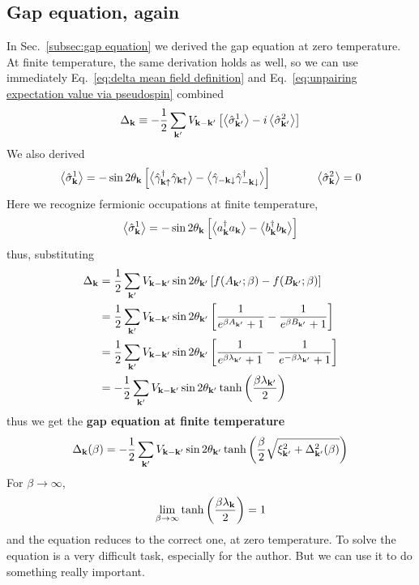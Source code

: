 \subsection{Gap equation, again}

In Sec.~\ref{subsec:gap equation} we derived the gap equation at zero temperature. At finite temperature, the same derivation holds as well, so we can use immediately Eq.~\eqref{eq:delta mean field definition} and Eq.~\eqref{eq:unpairing expectation value via pseudospin} combined
\[
	\Delta_\mathbf{k} \equiv - \frac{1}{2} \sum_{\mathbf{k}'} V_{\mathbf{k}-\mathbf{k}'} \lrS{ \big\langle \hat{\sigma}_{\mathbf{k}'}^1 \big\rangle - i \ev{\hat{\sigma}_{\mathbf{k}'}^2} }
\]
We also derived
\[
	\big\langle \hat{\sigma}_\mathbf{k}^1 \big\rangle = - \sin 2\theta_\mathbf{k} \left[{\big\langle \hat{\gamma}_{\mathbf{k}\uparrow}^\dagger \hat{\gamma}_{\mathbf{k}\uparrow} \big\rangle - \big\langle \hat{\gamma}_{-\mathbf{k}\downarrow} \hat{\gamma}_{-\mathbf{k}\downarrow}^\dagger \big\rangle}\right]
	\qquad\qquad
	\big\langle \hat{\sigma}_\mathbf{k}^2 \big\rangle = 0
\]
Here we recognize fermionic occupations at finite temperature,
\[
	\big\langle \hat{\sigma}_\mathbf{k}^1 \big\rangle = - \sin 2\theta_\mathbf{k} \left[{
		\big\langle a_\mathbf{k}^\dagger a_\mathbf{k} \big\rangle -
		\big\langle b_\mathbf{k}^\dagger b_\mathbf{k} \big\rangle
	}\right]
\]
thus, substituting
\[
\begin{aligned}
	\Delta_\mathbf{k} &= \frac{1}{2} \sum_{\mathbf{k}'} V_{\mathbf{k}-\mathbf{k}'} \sin 2\theta_{\mathbf{k}'} \left[{
		f(A_{\mathbf{k}'};\beta) - f(B_{\mathbf{k}'};\beta)
	}\right] \\
	&= \frac{1}{2} \sum_{\mathbf{k}'} V_{\mathbf{k}-\mathbf{k}'} \sin 2\theta_{\mathbf{k}'} \left[{
		\frac{1}{e^{\beta A_{\mathbf{k}'}} + 1} - \frac{1}{e^{\beta B_{\mathbf{k}'}} + 1}
	}\right] \\
	&= \frac{1}{2} \sum_{\mathbf{k}'} V_{\mathbf{k}-\mathbf{k}'} \sin 2\theta_{\mathbf{k}'} \left[{
		\frac{1}{e^{\beta \lambda_{\mathbf{k}'}} + 1} - \frac{1}{e^{ -\beta \lambda_{\mathbf{k}'}} + 1}
	}\right] \\
	&= - \frac{1}{2} \sum_{\mathbf{k}'} V_{\mathbf{k}-\mathbf{k}'} \sin 2\theta_{\mathbf{k}'} \tanh \left({ \frac{\beta \lambda_{\mathbf{k}'}}{2}}\right)
\end{aligned}
\]
thus we get the \textbf{gap equation at finite temperature}
\begin{equation}\label{eq:gap equation at finite temperature}
	\Delta_\mathbf{k} (\beta) = - \frac{1}{2} \sum_{\mathbf{k}'} V_{\mathbf{k}-\mathbf{k}'} \sin 2\theta_{\mathbf{k}'} \tanh \left({ \frac{\beta}{2} \sqrt{\xi_{\mathbf{k}'}^2 + \Delta_{\mathbf{k}'}^2 (\beta)} }\right)
\end{equation}
For $\beta\to\infty$,
\[
	\lim_{\beta\to\infty} \tanh \left({ \frac{\beta \lambda_\mathbf{k}}{2}}\right) = 1
\]
and the equation reduces to the correct one, at zero temperature. To solve the equation is a very difficult task, especially for the author. But we can use it to do something really important.

